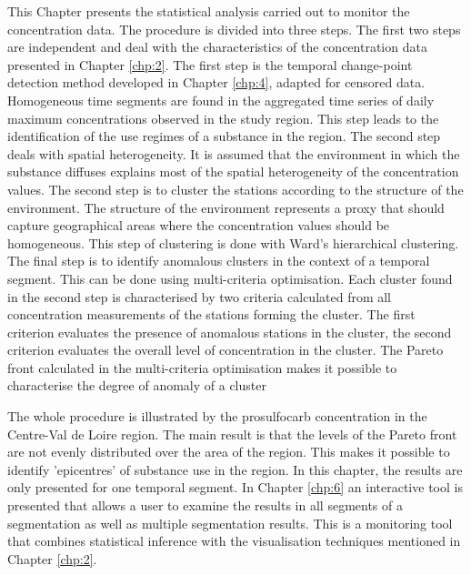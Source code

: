 This Chapter presents the statistical analysis carried out to monitor the concentration data. The procedure is divided into three steps. The first two steps are independent and deal with the characteristics of the concentration data presented in Chapter \ref{chp:2}. The first step is the temporal change-point detection method developed in Chapter \ref{chp:4}, adapted for censored data. Homogeneous time segments are found in the aggregated time series of daily maximum concentrations observed in the study region. This step leads to the identification of the use regimes of a substance in the region. The second step deals with spatial heterogeneity. It is assumed that the environment in which the substance diffuses explains most of the spatial heterogeneity of the concentration values. The second step is to cluster the stations according to the structure of the environment. The structure of the environment represents a proxy that should capture geographical areas where the concentration values should be homogeneous. This step of clustering is done with Ward's hierarchical clustering. The final step is to identify anomalous clusters in the context of a temporal segment. This can be done using multi-criteria optimisation. Each cluster found in the second step is characterised by two criteria calculated from all concentration measurements of the stations forming the cluster. The first criterion evaluates the presence of anomalous stations in the cluster, the second criterion evaluates the overall level of concentration in the cluster. The Pareto front calculated in the multi-criteria optimisation makes it possible to characterise the degree of anomaly of a cluster 

The whole procedure is illustrated by the prosulfocarb concentration in the Centre-Val de Loire region. The main result is that the levels of the Pareto front are not evenly distributed over the area of the region. This makes it possible to identify 'epicentres' of substance use in the region. In this chapter, the results are only presented for one temporal segment. In Chapter \ref{chp:6} an interactive tool is presented that allows a user to examine the results in all segments of a segmentation as well as multiple segmentation results. This is a monitoring tool that combines statistical inference with the visualisation techniques mentioned in Chapter \ref{chp:2}.